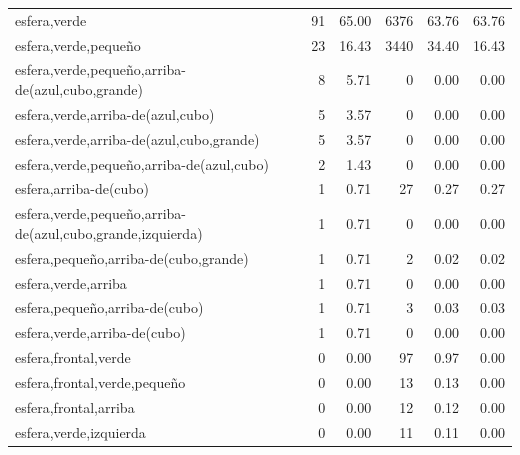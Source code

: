 \begin{table}
\begin{small}
\begin{center}
\begin{tabular}{|l|r|r|r|r|r|}
esfera,verde                                    & 91 & 65.00 & 6376 & 63.76 & 63.76 \\
esfera,verde,peque\~no                              & 23 & 16.43 & 3440 & 34.40 & 16.43 \\
esfera,verde,peque\~no,arriba-de(azul,cubo,grande)      &  8 &  5.71 &    0 &  0.00 &  0.00\\
esfera,verde,arriba-de(azul,cubo)                  &  5 &  3.57 &    0 &  0.00 &  0.00\\
esfera,verde,arriba-de(azul,cubo,grande)            &  5 &  3.57 &    0 &  0.00 &  0.00\\
esfera,verde,peque\~no,arriba-de(azul,cubo)            &  2 &  1.43 &    0 &  0.00 &  0.00\\
esfera,arriba-de(cubo)                             &  1 &  0.71 &   27 &  0.27 &  0.27 \\
esfera,verde,peque\~no,arriba-de(azul,cubo,grande,izquierda) &  1 &  0.71 &    0 &  0.00 &  0.00\\
esfera,peque\~no,arriba-de(cubo,grande)	              &  1 &  0.71 &    2 &  0.02 &  0.02 \\
esfera,verde,arriba                                &  1 &  0.71 &    0 &  0.00 &  0.00\\
esfera,peque\~no,arriba-de(cubo)                       &  1 &  0.71 &    3 &  0.03 &  0.03 \\
esfera,verde,arriba-de(cubo)                       &  1 &  0.71 &    0 &  0.00 &  0.00\\
esfera,frontal,verde                              &  0 &  0.00 &   97 &  0.97 &  0.00\\
esfera,frontal,verde,peque\~no                        &  0 &  0.00 &   13 &  0.13 &  0.00\\
esfera,frontal,arriba                                &  0 &  0.00 &   12 &  0.12 &  0.00\\
esfera,verde,izquierda	                              &  0 &  0.00 &   11 &  0.11 &  0.00\\

\end{tabular}
\end{center}
\end{small}
\end{table}
